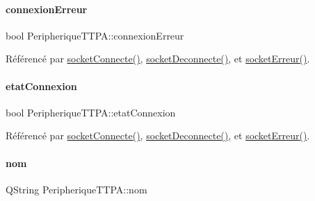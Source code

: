 \mbox{\label{class_peripherique_t_t_p_a_a9602c4662641984ea44bf6caaac6e94c}} 
\paragraph{\texorpdfstring{connexion\+Erreur}{connexionErreur}}
{\footnotesize\ttfamily bool Peripherique\+T\+T\+P\+A\+::connexion\+Erreur}



Référencé par \hyperlink{class_peripherique_t_t_p_a_aab23a43f5c9d70c30df3dbf4aeeeff9d}{socket\+Connecte()}, \hyperlink{class_peripherique_t_t_p_a_adb04c45864ea56a80a0716cde0a31856}{socket\+Deconnecte()}, et \hyperlink{class_peripherique_t_t_p_a_a85811ace874ff7cea3437146511f1b2c}{socket\+Erreur()}.

\mbox{\label{class_peripherique_t_t_p_a_a3aaac9f045cc038777895afe18411e58}} 
\paragraph{\texorpdfstring{etat\+Connexion}{etatConnexion}}
{\footnotesize\ttfamily bool Peripherique\+T\+T\+P\+A\+::etat\+Connexion}



Référencé par \hyperlink{class_peripherique_t_t_p_a_aab23a43f5c9d70c30df3dbf4aeeeff9d}{socket\+Connecte()}, \hyperlink{class_peripherique_t_t_p_a_adb04c45864ea56a80a0716cde0a31856}{socket\+Deconnecte()}, et \hyperlink{class_peripherique_t_t_p_a_a85811ace874ff7cea3437146511f1b2c}{socket\+Erreur()}.

\mbox{\label{class_peripherique_t_t_p_a_afafe3566b4b5357819811218b9a4244f}} 
\paragraph{\texorpdfstring{nom}{nom}}
{\footnotesize\ttfamily Q\+String Peripherique\+T\+T\+P\+A\+::nom\hspace{0.3cm}{\ttfamily [read]}}



